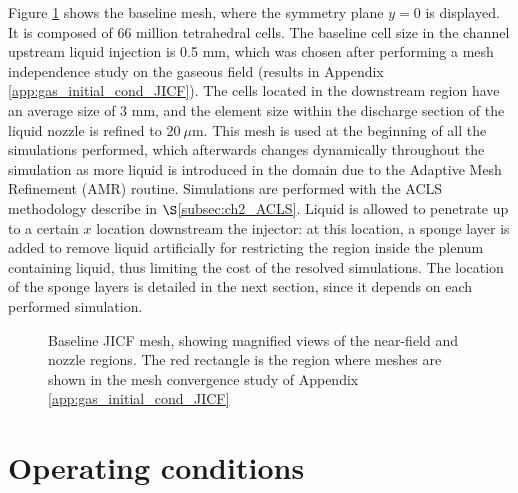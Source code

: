 Figure \ref{fig:jicf_dlr_mesh} shows the baseline mesh, where the symmetry plane $y = 0$ is displayed. It is composed of 66 million tetrahedral cells. The baseline cell size in the channel upstream liquid injection is 0.5 mm, which was chosen after performing a mesh independence study on the gaseous field (results in Appendix \ref{app:gas_initial_cond_JICF}). The cells located in the downstream region have an average size of 3 mm, and the element size within the discharge section of the liquid nozzle is refined to $20~\mu$m. This mesh is used at the beginning of all the simulations performed, which afterwards changes dynamically throughout the simulation as more liquid is introduced in the domain due to the Adaptive Mesh Refinement (AMR) routine. Simulations are performed with the ACLS methodology describe in $\S$\ref{subsec:ch2_ACLS}. Liquid is allowed to penetrate up to a certain $x$ location downstream the injector: at this location, a sponge layer is added to remove liquid artificially for restricting the region inside the plenum containing liquid, thus limiting the cost of the resolved simulations. The location of the sponge layers is detailed in the next section, since it depends on each performed simulation.

\begin{figure}[h!]
	\centering	{}
	\caption[Baseline JICF mesh, showing magnified views of the near-field and nozzle regions.]{Baseline JICF mesh, showing magnified views of the near-field and nozzle regions. The red rectangle is the region where meshes are shown in the mesh convergence study of Appendix \ref{app:gas_initial_cond_JICF}}
	\label{fig:jicf_dlr_mesh}
\end{figure}





\section{Operating conditions}
\label{sec:JICF_SPS_OPs_detailed}

